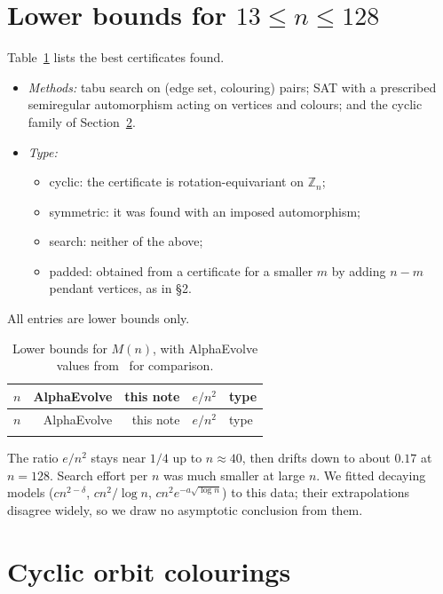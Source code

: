 \documentclass[11pt]{amsart}
\theoremstyle{definition}
\newcommand{\Z}{\mathbb{Z}}
\newcommand{\M}{M}
\begin{document}
\section{Lower bounds for $13\le n\le128$}

Table~\ref{tab:lb} lists the best certificates found.
\begin{itemize}
\item \emph{Methods:} tabu search on (edge set, colouring) pairs; SAT with a prescribed
  semiregular automorphism acting on vertices and colours; and the cyclic family of
  Section~\ref{sec:cyclic}.
\item \emph{Type:}
  \begin{itemize}
  \item cyclic: the certificate is rotation-equivariant on $\Z_n$;
  \item symmetric: it was found with an imposed automorphism;
  \item search: neither of the above;
  \item padded: obtained from a certificate for a smaller $m$ by adding $n-m$ pendant
    vertices, as in \S2.
  \end{itemize}
\end{itemize}
All entries are lower bounds only.

{\small
\begin{longtable}{rrrrl}
\caption{Lower bounds for $\M(n)$, with AlphaEvolve values from~\cite{TaoAE} for
  comparison.}\label{tab:lb}\\
\toprule
$n$ & AlphaEvolve & this note & $e/n^2$ & type\\
\midrule
\endfirsthead
\toprule
$n$ & AlphaEvolve & this note & $e/n^2$ & type\\
\midrule
\endhead
\bottomrule
\endlastfoot

\end{longtable}
}

The ratio $e/n^2$ stays near $1/4$ up to $n\approx 40$, then drifts down to about $0.17$ at
$n=128$. Search effort per $n$ was much smaller at large $n$. We fitted decaying models
($cn^{2-\delta}$, $cn^2/\log n$, $cn^2e^{-a\sqrt{\log n}}$) to this data; their
extrapolations disagree widely, so we draw no asymptotic conclusion from them.

\section{Cyclic orbit colourings}\label{sec:cyclic}
\end{document}

